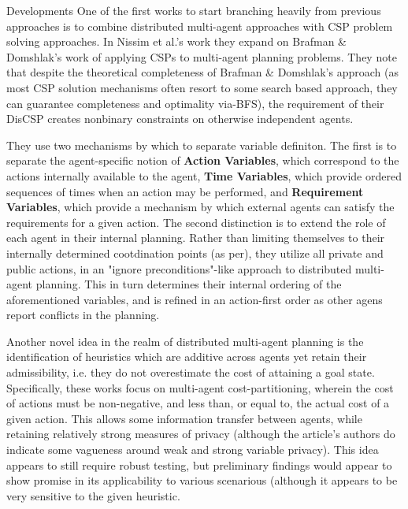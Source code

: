 \documentclass{article}
\begin{document}
\begin{section}{Developments}
	One of the first works to start branching heavily from previous approaches is to combine distributed multi-agent
	approaches with CSP problem solving approaches. In Nissim et al.'s work\cite{nissim} they expand on Brafman \& Domshlak's 
	work of applying CSPs to multi-agent planning problems\cite{brafman}. They note that despite the theoretical completeness
	of Brafman \& Domshlak's approach (as most CSP solution mechanisms often resort to some search based approach, they can
	guarantee completeness and optimality via-BFS), the requirement of their DisCSP creates nonbinary constraints on otherwise
	independent agents.\cite{nissim}\par
	They use two mechanisms by which to separate variable definiton. The first is to separate the agent-specific notion of 
	\textbf{Action Variables}, which correspond to the actions internally available to the agent, \textbf{Time Variables}, which provide 
	ordered sequences of times when an action may be performed, and \textbf{Requirement Variables}, which provide a mechanism by
	which external agents can satisfy the requirements for a given action. The second distinction is to extend the role of each agent in their 
	internal planning. Rather than limiting themselves to their internally determined cootdination points (as per\cite{brafman}), they utilize
	all private and public actions, in an "ignore preconditions"-like approach to distributed multi-agent planning. This in turn determines
	their internal ordering of the aforementioned variables, and is refined in an action-first order as other agens report conflicts in the
	planning.\par
	Another novel idea in the realm of distributed multi-agent planning is the identification of heuristics which are additive across agents
	yet retain their admissibility, i.e. they do not overestimate the cost of attaining a goal state.\cite{stolba} Specifically, these works 
	focus on multi-agent cost-partitioning, wherein the cost of actions must be non-negative, and less than, or equal to, the actual cost of
	a given action. This allows some information transfer between agents, while retaining relatively strong measures of privacy (although the 
	article's authors do indicate some vagueness around weak and strong variable privacy).\cite{stolba} This idea appears to still require 
	robust testing, but preliminary findings would appear to show promise in its applicability to various scenarious (although it appears
	to be very sensitive to the given heuristic.
	
\end{section}
\end{document}
